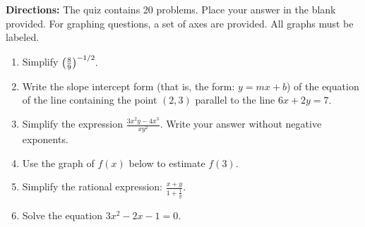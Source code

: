 \documentclass[12pt]{article}
\begin{document}
\textbf{Directions:} The quiz contains 20 problems. Place your answer in the blank provided. For graphing questions, a set of axes are provided. All graphs must be labeled.
\begin{enumerate}
\item Simplify ${\large{\left(\frac{8}{9}\right)^{-1/2}}}.$


\quad \hfill \underline{\hspace{2in}}
\vfill

\item Write the slope intercept form (that is, the form: $y=mx+b$) of the equation of the line containing the point $(2,3)$ parallel to the line $6x+2y=7.$


\quad \hfill \underline{\hspace{2in}}
\vfill

\item  Simplify the expression $\displaystyle{\frac{3x^2y-4x^3}{xy^2}}$. Write your answer without negative exponents.
%

\quad \hfill \underline{\hspace{2in}}
\vfill

\item Use the graph of $f(x)$ below to estimate $f(3).$
% 

\quad \hfill \underline{\hspace{2in}}
\vfill

\item Simplify the rational expression: $\displaystyle{\frac{x+y}{1+\frac{1}{y}}}.$
%

\quad \hfill \underline{\hspace{2in}}
\vfill
\newpage

\item Solve the equation $3x^2-2x-1=0.$
%


\end{enumerate}
\end{document}
